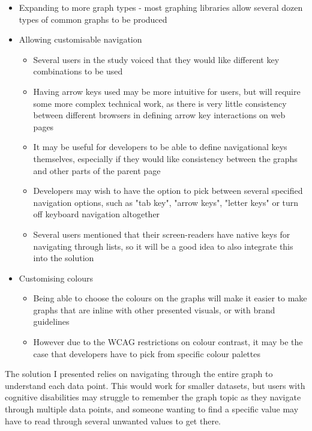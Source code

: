 \documentclass[ %
                    author={Aleena Baig},
                supervisor={Dr Simon Lock},
                    degree={BSc},
                     title={On Making Web Accessible Graphs},
                  subtitle={},
                      year={2019} ]{dissertation}
\begin{document}
\begin{itemize}
    \item Expanding to more graph types - most graphing libraries allow several dozen types of common graphs to be produced
    \item Allowing customisable navigation
        \begin{itemize}
            \item Several users in the study voiced that they would like different key combinations to be used
            \item Having arrow keys used may be more intuitive for users, but will require some more complex technical work, as there is very little consistency between different browsers in defining arrow key interactions on web pages
            \item It may be useful for developers to be able to define navigational keys themselves, especially if they would like consistency between the graphs and other parts of the parent page
            \item Developers may wish to have the option to pick between several specified navigation options, such as "tab key", "arrow keys", "letter keys" or turn off keyboard navigation altogether
            \item Several users mentioned that their screen-readers have native keys for navigating through lists, so it will be a good idea to also integrate this into the solution
        \end{itemize}
    \item Customising colours
        \begin{itemize}
            \item Being able to choose the colours on the graphs will make it easier to make graphs that are inline with other presented visuals, or with brand guidelines
            \item However due to the WCAG restrictions on colour contrast, it may be the case that developers have to pick from specific colour palettes
        \end{itemize}
\end{itemize}

The solution I presented relies on navigating through the entire graph to understand each data point. This would work for smaller datasets, but users with cognitive disabilities may struggle to remember the graph topic as they navigate through multiple data points, and someone wanting to find a specific value may have to read through several unwanted values to get there.
\end{document}
